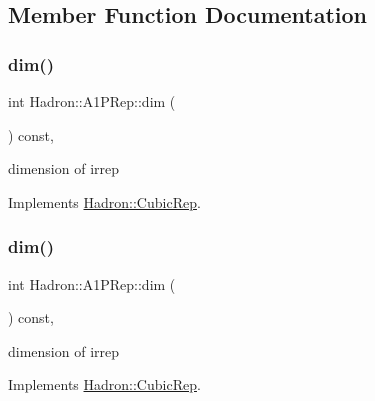 \subsection{Member Function Documentation}
\mbox{\label{structHadron_1_1A1PRep_a76603c4dc897bd41f2a01f55b209391b}} 
\subsubsection{\texorpdfstring{dim()}{dim()}\hspace{0.1cm}{\footnotesize\ttfamily [1/3]}}
{\footnotesize\ttfamily int Hadron\+::\+A1\+P\+Rep\+::dim (\begin{DoxyParamCaption}{ }\end{DoxyParamCaption}) const\hspace{0.3cm}{\ttfamily [inline]}, {\ttfamily [virtual]}}

dimension of irrep 

Implements \mbox{\hyperlink{structHadron_1_1CubicRep_ac178d14064f037a66af4b9fb4b312d51}{Hadron\+::\+Cubic\+Rep}}.

\mbox{\label{structHadron_1_1A1PRep_a76603c4dc897bd41f2a01f55b209391b}} 
\subsubsection{\texorpdfstring{dim()}{dim()}\hspace{0.1cm}{\footnotesize\ttfamily [2/3]}}
{\footnotesize\ttfamily int Hadron\+::\+A1\+P\+Rep\+::dim (\begin{DoxyParamCaption}{ }\end{DoxyParamCaption}) const\hspace{0.3cm}{\ttfamily [inline]}, {\ttfamily [virtual]}}

dimension of irrep 

Implements \mbox{\hyperlink{structHadron_1_1CubicRep_ac178d14064f037a66af4b9fb4b312d51}{Hadron\+::\+Cubic\+Rep}}.

\mbox{\label{structHadron_1_1A1PRep_a76603c4dc897bd41f2a01f55b209391b}} 
